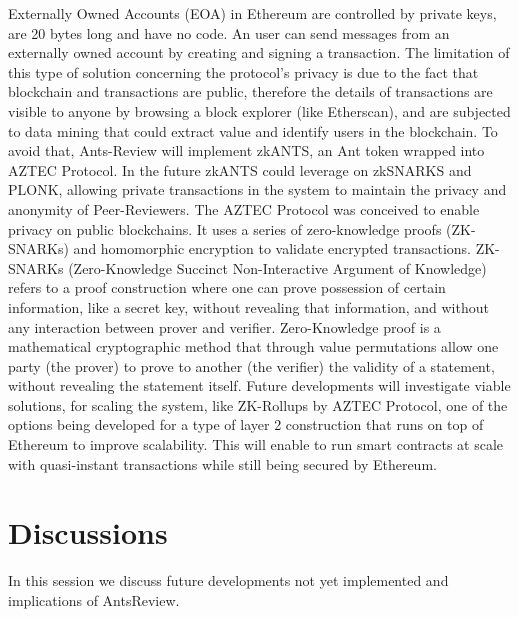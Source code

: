\documentclass[runningheads]{llncs}
\begin{document}
 Externally Owned Accounts (EOA) in Ethereum are controlled by private keys, are 20 bytes long and have no code. An user can send messages from an externally owned account by creating and signing a transaction. The limitation of this type of solution concerning the protocol's privacy is due to the fact that blockchain and transactions are public, therefore the details of transactions are visible to anyone by browsing a block explorer (like Etherscan), and are subjected to data mining that could extract value and identify users in the blockchain.
\newline To avoid that, Ants-Review will implement zkANTS, an Ant token wrapped into AZTEC Protocol. In the future zkANTS could leverage on zkSNARKS and PLONK, allowing private transactions in the system to maintain the privacy and anonymity of Peer-Reviewers.
\newline The AZTEC Protocol was conceived to enable privacy on public blockchains. It uses a series of zero-knowledge proofs (ZK-SNARKs) and homomorphic encryption to validate encrypted transactions.
\newline ZK-SNARKs (Zero-Knowledge Succinct Non-Interactive Argument of Knowledge) \cite{ZKSNARKs} refers to a proof construction where one can prove possession of certain information, like a secret key, without revealing that information, and without any interaction between prover and verifier.
\newline Zero-Knowledge \cite{ZeroKnoledge} proof is a mathematical cryptographic method that through value permutations allow one party (the prover) to prove to another (the verifier) the validity of a statement, without revealing the statement itself.
\newline Future developments will investigate viable solutions, for scaling the system, like ZK-Rollups by AZTEC Protocol, one of the options being developed for a type of layer 2 construction that runs on top of Ethereum to improve scalability. This will enable to run smart contracts at scale with quasi-instant transactions while still being secured by Ethereum.

\section{Discussions}
In this session we discuss future developments not yet implemented and implications of AntsReview.
\end{document}
